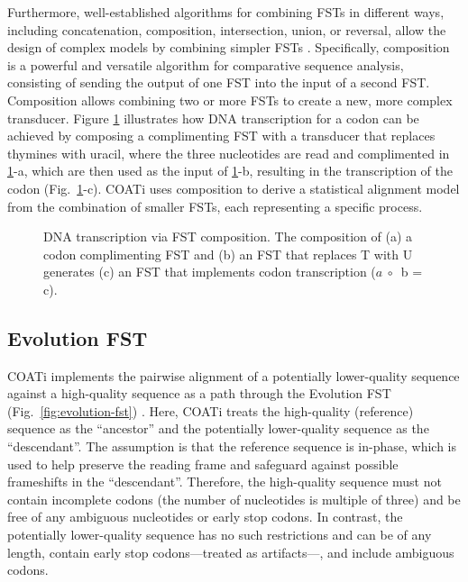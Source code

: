 Furthermore, well-established algorithms for combining FSTs in different ways, including concatenation, composition, intersection, union, or reversal, allow the design of complex models by combining simpler FSTs \citep{bradley2007transducers,silvestre2021machine}.
Specifically, composition is a powerful and versatile algorithm for comparative sequence analysis, consisting of sending the output of one FST into the input of a second FST.
Composition allows combining two or more FSTs to create a new, more complex transducer. Figure \ref{fig:transcription} illustrates how DNA transcription for a codon can be achieved by composing a complimenting FST with a transducer that replaces thymines with uracil, where the three nucleotides are read and complimented in \ref{fig:transcription}-a, which are then used as the input of \ref{fig:transcription}-b, resulting in the transcription of the codon (Fig.~\ref{fig:transcription}-c). COATi uses composition to derive a statistical alignment model from the combination of smaller FSTs, each representing a specific process.

\begin{figure}[!ht]
    \centering
    \hspace*{-3.5em}\resizebox{1.05\textwidth}{!}{}
    \caption[DNA Transcription via FST Composition]{DNA transcription via FST composition. The composition of (a) a codon complimenting FST and (b) an FST that replaces T with U generates (c) an FST that implements codon transcription ($a~\circ$~b = c).}
    \label{fig:transcription}
\end{figure}

\subsection{Evolution FST}

COATi implements the pairwise alignment of a potentially lower-quality sequence against a high-quality sequence as a path through the Evolution FST (Fig.~\ref{fig:evolution-fst}) \citep[c.f.][]{holmes2001evolutionary}.
Here, COATi treats the high-quality (reference) sequence as the ``ancestor'' and the potentially lower-quality sequence as the ``descendant''. The assumption is that the reference sequence is in-phase, which is used to help preserve the reading frame and safeguard against possible frameshifts in the ``descendant''. Therefore, the high-quality sequence must not contain incomplete codons (the number of nucleotides is multiple of three) and be free of any ambiguous nucleotides or early stop codons. In contrast, the potentially lower-quality sequence has no such restrictions and can be of any length, contain early stop codons---treated as artifacts---, and include ambiguous codons.

